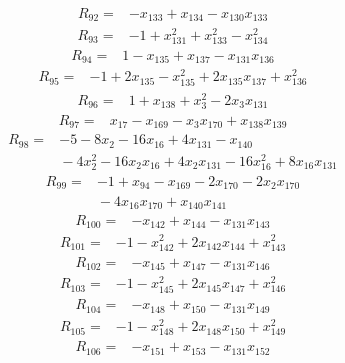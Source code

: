 \begin{align*}
R_{92} ={}& -x_{133} + x_{134} - x_{130} x_{133}
\end{align*}
\begin{align*}
R_{93} ={}& -1 + x_{131}^{2} + x_{133}^{2} - x_{134}^{2}
\end{align*}
\begin{align*}
R_{94} ={}& 1 - x_{135} + x_{137} - x_{131} x_{136}
\end{align*}
\begin{align*}
R_{95} ={}& -1 + 2x_{135} - x_{135}^{2} + 2x_{135} x_{137} + x_{136}^{2}
\end{align*}
\begin{align*}
R_{96} ={}& 1 + x_{138} + x_{3}^{2} - 2x_{3} x_{131}
\end{align*}
\begin{align*}
R_{97} ={}& x_{17} - x_{169} - x_{3} x_{170} + x_{138} x_{139}
\end{align*}
\begin{align*}
R_{98} ={}& -5 - 8x_{2} - 16x_{16} + 4x_{131} - x_{140} \\
&{} -4x_{2}^{2} - 16x_{2} x_{16} + 4x_{2} x_{131} - 16x_{16}^{2} + 8x_{16} x_{131}
\end{align*}
\begin{align*}
R_{99} ={}& -1 + x_{94} - x_{169} - 2x_{170} - 2x_{2} x_{170} \\
&{} -4x_{16} x_{170} + x_{140} x_{141}
\end{align*}
\begin{align*}
R_{100} ={}& -x_{142} + x_{144} - x_{131} x_{143}
\end{align*}
\begin{align*}
R_{101} ={}& -1 - x_{142}^{2} + 2x_{142} x_{144} + x_{143}^{2}
\end{align*}
\begin{align*}
R_{102} ={}& -x_{145} + x_{147} - x_{131} x_{146}
\end{align*}
\begin{align*}
R_{103} ={}& -1 - x_{145}^{2} + 2x_{145} x_{147} + x_{146}^{2}
\end{align*}
\begin{align*}
R_{104} ={}& -x_{148} + x_{150} - x_{131} x_{149}
\end{align*}
\begin{align*}
R_{105} ={}& -1 - x_{148}^{2} + 2x_{148} x_{150} + x_{149}^{2}
\end{align*}
\begin{align*}
R_{106} ={}& -x_{151} + x_{153} - x_{131} x_{152}
\end{align*}
